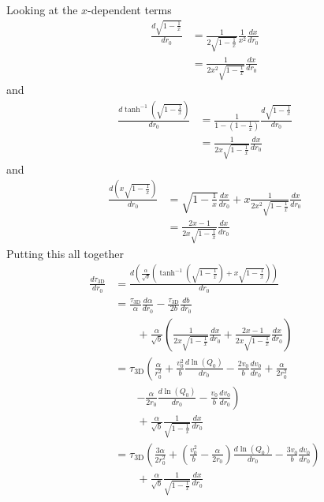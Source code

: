 \documentclass[aps,prl,twocolumn,showpacs,superscriptaddress,groupedaddress]{revtex4-1}  %
\begin{document}
Looking at the $x$-dependent terms
\begin{align}
  \frac{d \sqrt{1 - \frac{1}{x}}}{d r_0} &= \frac{1}{2 \sqrt{1 - \frac{1}{x}}} \frac{1}{x^2} \frac{d x}{d r_0}\nonumber\\
                                                        &= \frac{1}{2 x^2 \sqrt{1 - \frac{1}{x}}}\frac{d x}{d r_0} \label{eq:derivative sqrt 1 minus 1 over x}
\end{align}
and 
\begin{align}
  \frac{d \tanh^{-1}\left(\sqrt{1 - \frac{1}{x}}\right)}{d r_0} &= \frac{1}{1 - \left(1 - \frac{1}{x}\right)} \frac{d \sqrt{1 - \frac{1}{x}}}{d r_0}\nonumber\\
                                                                                        &= \frac{1}{2x \sqrt{1 - \frac{1}{x}}} \frac{d x}{d r_0}\label{eq:derivative arctanh term}
\end{align} 
and
\begin{align}
  \frac{d \left(x \sqrt{1 - \frac{1}{x}}\right)}{d r_0} &= \sqrt{1 - \frac{1}{x}} \frac{d x}{d r_0} + x \frac{1}{2 x^2 \sqrt{1 - \frac{1}{x}}} \frac{d x}{d r_0}\nonumber\\
                                                                      &=  \frac{2 x - 1 }{2 x \sqrt{1 - \frac{1}{x}}} \frac{d x}{d r_0} \label{eq:derivative x over sqrt 1 minus 1 over x}
\end{align}
Putting this all together
\begin{align}
  \frac{d \tau_\text{3D}}{d r_0} &= \frac{d \left( \frac{\alpha}{\sqrt{b}} \left( \tanh^{-1} \left( \sqrt{1 -  \frac{1}{x}} \right) + x\sqrt{1 -  \frac{1}{x}} \right) \right)}{d r_0} \nonumber\\
                                                &= \frac{\tau_\text{3D}}{\alpha} \frac{d \alpha}{d r_0} - \frac{\tau_\text{3D}}{2 b} \frac{d b}{d r_0} \nonumber\\
                                                &\quad\quad + \frac{\alpha}{\sqrt{b}} \left( \frac{1}{2 x \sqrt{1 - \frac{1}{x}}} \frac{d x}{d r_0} + \frac{2 x - 1}{2 x \sqrt{1 - \frac{1}{x}}} \frac{d x}{d r_0} \right)\nonumber\\
                                                &= \tau_\text{3D}\left( \frac{\alpha}{r_0^2} + \frac{v_0^2}{b} \frac{d \ln(Q_0)}{d r_0} - \frac{2 v_0}{b} \frac{d v_0}{d r_0} + \frac{\alpha}{2 r_0^2} \right.\nonumber\\
                                                &\quad\quad \left.- \frac{\alpha}{2 r_0} \frac{d \ln(Q_0)}{d r_0} - \frac{v_0}{b}  \frac{d v_0}{dr_0} \right)\nonumber\\
                                                &\quad\quad + \frac{\alpha}{\sqrt{b}} \frac{1}{\sqrt{1 - \frac{1}{x}}} \frac{d x}{d r_0} \nonumber\\
                                                &= \tau_\text{3D}\left( \frac{3\alpha}{2 r_0^2}  + \left( \frac{v_0^2}{b} - \frac{\alpha}{2 r_0} \right) \frac{d \ln(Q_0)}{d r_0} - \frac{3 v_0}{b}  \frac{d v_0}{dr_0}\right) \nonumber\\
                                                &\quad\quad+ \frac{\alpha}{\sqrt{b}} \frac{1}{\sqrt{1 - \frac{1}{x}}} \frac{d x}{d r_0}\label{eq:derivative 3D tau}
\end{align}
\end{document}
